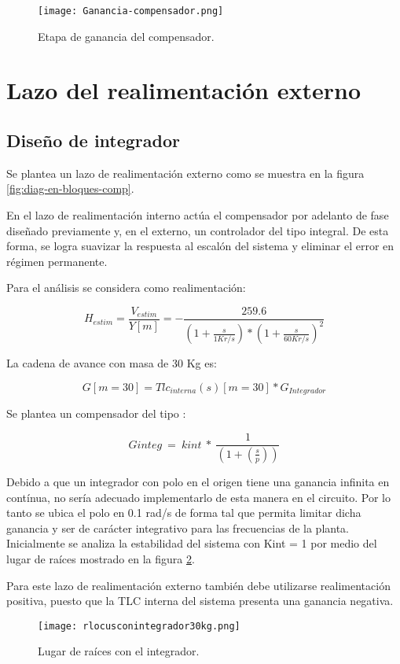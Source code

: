 \begin{figure}[H]
	\centering
	\texttt{[image: Ganancia-compensador.png]}
	\caption{Etapa de ganancia del compensador.}
	\label{fig:ganancia-compensador}
\end{figure}

\section{Lazo del realimentación externo}
\subsection{Diseño de integrador}

\noindent Se plantea un lazo de realimentaci\'{o}n externo como se muestra en la  figura \ref{fig:diag-en-bloques-comp}.

\noindent En el lazo de realimentaci\'{o}n interno act\'{u}a el compensador por adelanto de fase dise\~{n}ado previamente y, en el externo, un controlador del tipo integral. De esta forma, se logra suavizar la respuesta al escal\'{o}n del sistema y eliminar el error en r\'{e}gimen permanente.


\noindent Para el an\'{a}lisis se considera como realimentaci\'{o}n: 

\[H_{estim}=\frac{V_{estim}}{Y[m]}= - \frac{259.6}{(1 + \frac{s}{1Kr/s})*(1+\frac{s}{60Kr/s})^2}\] 

\noindent La cadena de avance con masa de 30 Kg es:

\[G[m=30]=Tlc_{interna}(s)[m=30]*G_{Integrador}\] 

\noindent Se  plantea un compensador del tipo :

\[Ginteg\ =\ kint\ *\ \frac{1}{(1+(\frac{s}{p}))}\]

\noindent Debido a que un integrador con polo en el origen tiene una ganancia infinita en contínua, no sería adecuado implementarlo de esta manera en el circuito. Por lo tanto se ubica el polo en 0.1 rad/s de forma tal que permita limitar dicha ganancia y ser de carácter integrativo para las frecuencias de la planta. Inicialmente se analiza la estabilidad del sistema con Kint = 1 por medio del lugar de raíces mostrado en la figura \ref{fig:lugar-de-raices-con-integrador-analog}.

\noindent Para este lazo de realimentación externo también debe utilizarse realimentación positiva, puesto que la TLC interna del sistema presenta una ganancia negativa.


\begin{figure}[H]
	\centering
	\texttt{[image: rlocusconintegrador30kg.png]}
	\caption{Lugar de raíces con el integrador.}
	\label{fig:lugar-de-raices-con-integrador-analog}
\end{figure}


